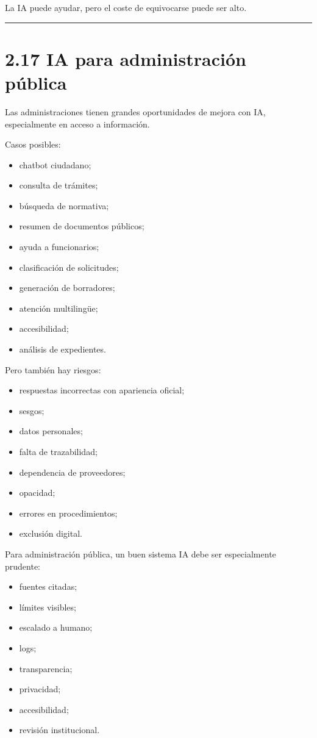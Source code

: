 La IA puede ayudar, pero el coste de equivocarse puede ser alto.

\begin{center}\rule{0.5\linewidth}{0.5pt}\end{center}

\section{2.17 IA para administración
pública}\label{ia-para-administraciuxf3n-puxfablica}

Las administraciones tienen grandes oportunidades de mejora con IA,
especialmente en acceso a información.

Casos posibles:

\begin{itemize}
\tightlist
\item
  chatbot ciudadano;
\item
  consulta de trámites;
\item
  búsqueda de normativa;
\item
  resumen de documentos públicos;
\item
  ayuda a funcionarios;
\item
  clasificación de solicitudes;
\item
  generación de borradores;
\item
  atención multilingüe;
\item
  accesibilidad;
\item
  análisis de expedientes.
\end{itemize}

Pero también hay riesgos:

\begin{itemize}
\tightlist
\item
  respuestas incorrectas con apariencia oficial;
\item
  sesgos;
\item
  datos personales;
\item
  falta de trazabilidad;
\item
  dependencia de proveedores;
\item
  opacidad;
\item
  errores en procedimientos;
\item
  exclusión digital.
\end{itemize}

Para administración pública, un buen sistema IA debe ser especialmente
prudente:

\begin{itemize}
\tightlist
\item
  fuentes citadas;
\item
  límites visibles;
\item
  escalado a humano;
\item
  logs;
\item
  transparencia;
\item
  privacidad;
\item
  accesibilidad;
\item
  revisión institucional.
\end{itemize}

